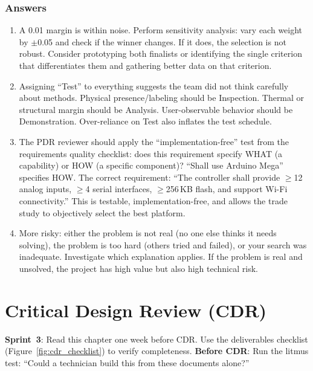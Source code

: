 \documentclass[11pt,letterpaper,twoside,openany]{book}
\begin{document}
\subsection{Answers}
\begin{enumerate}[leftmargin=1.5em]
\item A 0.01 margin is within noise. Perform sensitivity analysis: vary each weight by $\pm$0.05 and check if the winner changes. If it does, the selection is not robust. Consider prototyping both finalists or identifying the single criterion that differentiates them and gathering better data on that criterion.
\item Assigning ``Test'' to everything suggests the team did not think carefully about methods. Physical presence/labeling should be Inspection. Thermal or structural margin should be Analysis. User-observable behavior should be Demonstration. Over-reliance on Test also inflates the test schedule.

\item The PDR reviewer should apply the ``implementation-free'' test from the requirements quality checklist: does this requirement specify WHAT (a capability) or HOW (a specific component)? ``Shall use Arduino Mega'' specifies HOW. The correct requirement: ``The controller shall provide $\geq$12 analog inputs, $\geq$4 serial interfaces, $\geq$256\,KB flash, and support Wi-Fi connectivity.'' This is testable, implementation-free, and allows the trade study to objectively select the best platform.
\item More risky: either the problem is not real (no one else thinks it needs solving), the problem is too hard (others tried and failed), or your search was inadequate. Investigate which explanation applies. If the problem is real and unsolved, the project has high value but also high technical risk.
\end{enumerate}


\chapter{Critical Design Review (CDR)}\label{ch:cdr}

\begin{tipbox}
\textbf{Sprint~3}: Read this chapter one week before CDR. Use the deliverables checklist (Figure~\ref{fig:cdr_checklist}) to verify completeness. \textbf{Before CDR}: Run the litmus test: ``Could a technician build this from these documents alone?''
\end{tipbox}
\end{document}
